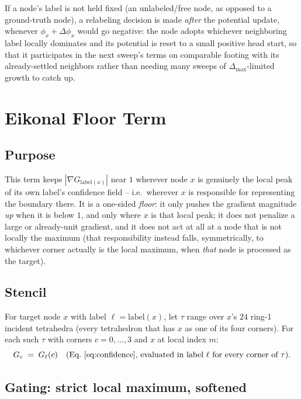 \documentclass[11pt]{article}
\newcommand{\grad}{\nabla}
\begin{document}
If a node's label is not held fixed (an unlabeled/free node, as opposed to
a ground-truth node), a relabeling decision is made \emph{after} the
potential update, whenever $\phi_x + \Delta\phi_x$ would go negative: the
node adopts whichever neighboring label locally dominates and its
potential is reset to a small positive head start, so that it participates
in the next sweep's terms on comparable footing with its already-settled
neighbors rather than needing many sweeps of $\Delta_{\max}$-limited growth
to catch up.

\section{Eikonal Floor Term}
\label{sec:eikonal}

\subsection{Purpose}

This term keeps $|\grad G_{\text{label}(x)}|$ near $1$ wherever node $x$ is
genuinely the local peak of its own label's confidence field -- i.e.\
wherever $x$ is responsible for representing the boundary there. It is a
one-sided \emph{floor}: it only pushes the gradient magnitude \emph{up}
when it is below $1$, and only where $x$ is that local peak; it does not
penalize a large or already-unit gradient, and it does not act at all at a
node that is not locally the maximum (that responsibility instead falls,
symmetrically, to whichever corner actually is the local maximum, when
\emph{that} node is processed as the target).

\subsection{Stencil}

For target node $x$ with label $\ell = \text{label}(x)$, let $\tau$ range
over $x$'s $24$ ring-1 incident tetrahedra (every tetrahedron that has $x$
as one of its four corners). For each such $\tau$ with corners $c=0,\dots,3$
and $x$ at local index $m$:
\begin{equation}
  G_c \;=\; G_\ell(c) \quad\text{(Eq.~\eqref{eq:confidence}, evaluated in
  label $\ell$ for every corner of $\tau$)}.
\end{equation}

\subsection{Gating: strict local maximum, softened}
\end{document}
